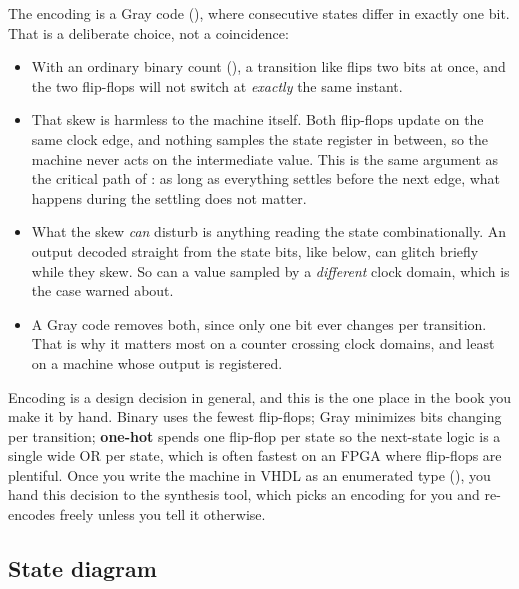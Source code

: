 \noindent The encoding is a Gray code (), where consecutive states
differ in exactly one bit. That is a deliberate choice, not a coincidence:
\begin{itemize}
  \item With an ordinary binary count (), a transition like
     flips two bits at once, and the two flip-flops will not switch at
    \emph{exactly} the same instant.
  \item That skew is harmless to the machine itself. Both flip-flops update on the same clock edge,
    and nothing samples the state register in between, so the machine never acts on the
    intermediate value. This is the same argument as the critical path of : as long
    as everything settles before the next edge, what happens during the settling does not matter.
  \item What the skew \emph{can} disturb is anything reading the state combinationally. An output
    decoded straight from the state bits, like  below, can glitch briefly while they skew.
    So can a value sampled by a \emph{different} clock domain, which is the case 
    warned about.
  \item A Gray code removes both, since only one bit ever changes per transition. That is why it
    matters most on a counter crossing clock domains, and least on a machine whose output is
    registered.
\end{itemize}
Encoding is a design decision in general, and this is the one place in the book you make it by
hand. Binary uses the fewest flip-flops; Gray minimizes bits changing per transition;
\textbf{one-hot} spends one flip-flop per state so the next-state logic is a single wide OR per
state, which is often fastest on an FPGA where flip-flops are plentiful. Once you write the machine
in VHDL as an enumerated type (), you hand this decision to the synthesis tool, which
picks an encoding for you and re-encodes freely unless you tell it otherwise.

\subsection{State diagram}
\label{c8:diagram}


